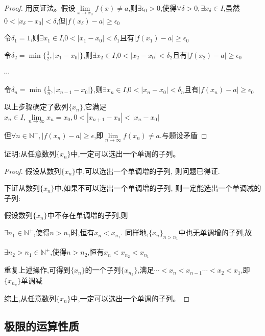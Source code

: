 \begin{proof}

    用反证法。假设$\lim \limits_{x \to x_0} f(x)\ne a$,则$\exists \epsilon_0>0$,使得$\forall \delta>0,\exists x_{\delta}\in I$,虽然$0<|x_{\delta}-x_0|<\delta$,但$|f(x_{\delta})-a|\ge \epsilon_0$

    令$\delta_1=1$,则$\exists x_1\in I$,$0<|x_1-x_0|<\delta_1 $且有$|f(x_1)-a|\ge \epsilon_0$

    令$\delta_2=\min \{\frac{1}{2},|x_1-x_0|\}$,则$\exists x_2\in I$,$0<|x_2-x_0|<\delta_2 $且有$|f(x_2)-a|\ge \epsilon_0$

    $\cdots$

    令$\delta_n=\min \{\frac{1}{n},|x_{n-1}-x_0|\}$,则$\exists x_n\in I$,$0<|x_n-x_0|<\delta_n $且有$|f(x_n)-a|\ge \epsilon_0$

    以上步骤确定了数列$\{x_n\}$,它满足$x_n\in I,\lim \limits_{n \to \infty} x_n = x_0,0<|x_{n+1}-x_0|<|x_n-x_0|$

    但$\forall n\in \mathbb{N}^+,|f(x_n)-a|\ge \epsilon$,即$\lim \limits_{n \to \infty} f(x_n) \ne a$.与题设矛盾
\end{proof}

\begin{example}
    证明:从任意数列$\{x_n\}$中,一定可以选出一个单调的子列。
\end{example}

\begin{proof}

    假设从数列$\{x_n\}$中,可以选出一个单调增的子列, 则问题已得证.

    下证从数列$\{x_n\}$中,如果不可以选出一个单调增的子列, 则一定能选出一个单调减的子列:

    假设数列$\{x_n\}$中不存在单调增的子列,则

    $\exists n_1 \in \mathbb{N}^+$,使得$n>n_1$时,恒有$x_n<x_{n_1}$. 同样地,$\{x_n\}_{n>n_1}$中也无单调增的子列,故

    $\exists n_2>n_1 \in \mathbb{N}^+$,使得$n>n_2$,恒有$x_n<x_{n_2}<x_{n_1}$

    重复上述操作,可得到$\{x_n\}$的一个子列$\{x_{n_k}\}$,满足$\cdots <x_n<x_{n-1}\cdots<x_2<x_1$,即$\{x_{n_k}\}$单调减

    综上,从任意数列$\{x_n\}$中,一定可以选出一个单调的子列。
\end{proof}

\vspace{-12pt}
\subsection{极限的运算性质}

